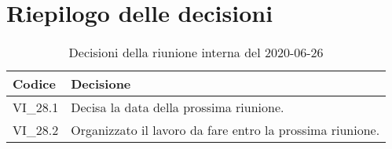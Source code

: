 \section{Riepilogo delle decisioni}
\begin{longtable}{ 
	 >{\centering}p{} >{}p{} }
	
	\caption{Decisioni della riunione interna del 2020-06-26}\\	
	
	\textbf{\color{white}Codice} & 
	\textbf{\color{white}Decisione} 
	\tabularnewline  
	\endhead
	
	VI\_28.1 & Decisa la data della prossima riunione. \\
	VI\_28.2 & Organizzato il lavoro da fare entro la prossima riunione. \\
\end{longtable}
